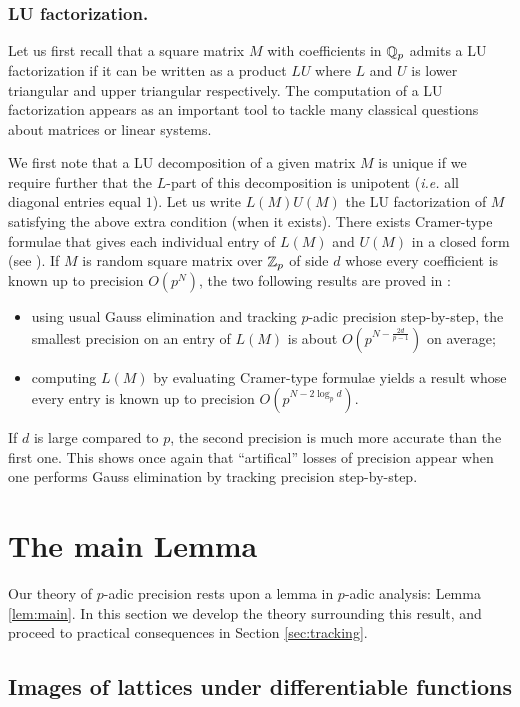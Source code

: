 \documentclass{lms}
\begin{document}
\subsubsection*{LU factorization.}


Let us first recall that a square matrix $M$ with coefficients in $\mathbb Q_p$ 
admits a LU factorization if it can be written as a product $LU$ where 
$L$ and $U$ is lower triangular and upper triangular respectively. 
The computation of a LU factorization appears as an important tool to 
tackle many classical questions about matrices or linear systems.

We first note that a LU decomposition of a given matrix $M$ is unique
if we require further that the $L$-part of this decomposition is
unipotent (\emph{i.e.} all diagonal entries equal $1$). Let us write
$L(M) U(M)$ the LU factorization of $M$ satisfying the above extra
condition (when it exists). There exists Cramer-type formulae that
gives each individual entry of $L(M)$ and $U(M)$ in a closed form
(see \cite{caruso:12a}).
If $M$ is random square matrix over $\mathbb Z_p$ of side $d$ whose every
coefficient is known up to precision $O(p^N)$, the two following
results are proved in \cite{caruso:12a}:
\begin{itemize}
\item using usual Gauss elimination and tracking $p$-adic precision 
step-by-step, the smallest precision on an entry of $L(M)$ is about
$O(p^{N - \frac{2d}{p-1}})$ on average;
\item computing $L(M)$ by evaluating Cramer-type formulae yields a
result whose every entry is known up to precision $O(p^{N - 2 \log_p 
d})$.
\end{itemize}
If $d$ is large compared to $p$, the second precision is much more
accurate than the first one. This shows once again that ``artifical''
losses of precision appear when one performs Gauss elimination by
tracking precision step-by-step.

\section{The main Lemma}
\label{sec:mainlemma}

Our theory of $p$-adic precision rests upon a lemma in $p$-adic 
analysis: Lemma \ref{lem:main}.  In this section we develop the theory 
surrounding this result, and proceed to practical consequences in 
Section \ref{sec:tracking}.

\subsection{Images of lattices under differentiable functions}
\end{document}
